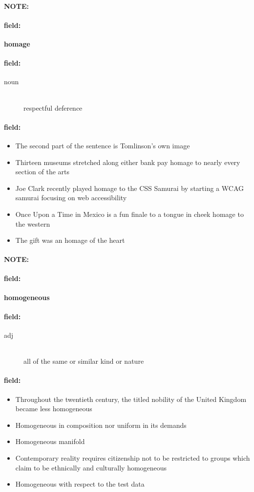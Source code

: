 \documentclass[12pt]{article}
\newenvironment{note}{\paragraph{NOTE:}}{}
\newenvironment{field}{\paragraph{field:}}{}
\begin{document}
\begin{note}
\begin{field}
\textbf{\large homage}
\end{field}


\begin{field}
\begin{description}
\item[noun] \hfill \\ 
respectful deference

\end{description}
\end{field}

\begin{field}
\begin{itemize}
\item The second part of the sentence is Tomlinson's own image
\item Thirteen museums stretched along either bank pay homage to nearly every section of the arts
\item Joe Clark recently played homage to the CSS Samurai by starting a WCAG samurai focusing on web accessibility
\item Once Upon a Time in Mexico is a fun finale to a tongue in cheek homage to the western
\item The gift was an homage of the heart
\end{itemize}
\end{field}
\end{note}
\begin{note}
\begin{field}
\textbf{\large homogeneous}
\end{field}


\begin{field}
\begin{description}
\item[adj] \hfill \\ 
all of the same or similar kind or nature

\end{description}
\end{field}

\begin{field}
\begin{itemize}
\item Throughout the twentieth century, the titled nobility of the United Kingdom became less homogeneous
\item Homogeneous in composition nor uniform in its demands
\item Homogeneous manifold
\item Contemporary reality requires citizenship not to be restricted to groups which claim to be ethnically and culturally homogeneous
\item Homogeneous with respect to the test data
\end{itemize}
\end{field}
\end{note}
\end{document}
